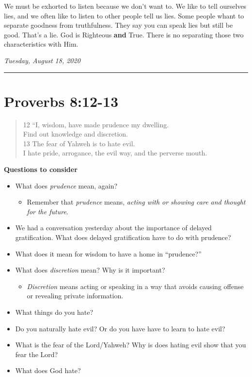 \documentclass[
]{book}
\providecommand{\tightlist}{%
  \setlength{\itemsep}{0pt}\setlength{\parskip}{0pt}}
\begin{document}
We must be exhorted to listen because we don't want to. We like to tell ourselves lies, and we often like to listen to other people tell us lies. Some people whant to separate goodness from truthfulness. They say you can speak lies but still be good. That's a lie. God is Righteous \textbf{and} True. There is no separating those two characteristics with Him.

\emph{Tuesday, August 18, 2020}

\begin{center}\rule{0.5\linewidth}{0.5pt}\end{center}

\hypertarget{proverbs-812-13}{%
\section{Proverbs 8:12-13}\label{proverbs-812-13}}

\begin{quote}
12 ``I, wisdom, have made prudence my dwelling.\\
Find out knowledge and discretion.\\
13 The fear of Yahweh is to hate evil.\\
I hate pride, arrogance, the evil way, and the perverse mouth.
\end{quote}

\textbf{Questions to consider}

\begin{itemize}
\tightlist
\item
  What does \emph{prudence} mean, again?

  \begin{itemize}
  \tightlist
  \item
    Remember that \emph{prudence} means, \emph{acting with or showing care and thought for the future}.
  \end{itemize}
\item
  We had a conversation yesterday about the importance of delayed gratification. What does delayed gratification have to do with prudence?
\item
  What does it mean for wisdom to have a home in ``prudence?''
\item
  What does \emph{discretion} mean? Why is it important?

  \begin{itemize}
  \tightlist
  \item
    \emph{Discretion} means acting or speaking in a way that avoids causing offense or revealing private information.
  \end{itemize}
\item
  What things do you hate?
\item
  Do you naturally hate evil? Or do you have have to learn to hate evil?
\item
  What is the fear of the Lord/Yahweh? Why is does hating evil show that you fear the Lord?
\item
  What does God hate?
\end{itemize}
\end{document}
